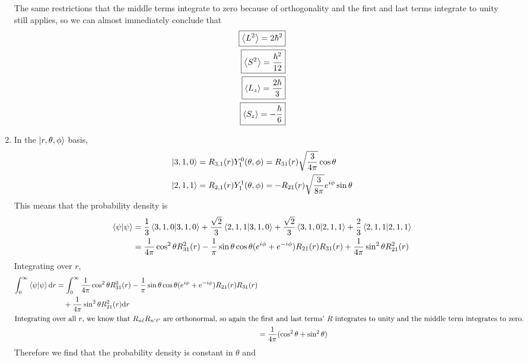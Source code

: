 \begin{enumerate}
		The same restrictions that the middle terms integrate to zero because
		of orthogonality and the first and last terms integrate to unity still
		applies, so we can almost immediately conclude that
		\begin{align}
			\boxed{\expval{L^2} = 2{\hbar}^2} \\
			\boxed{\expval{S^2} = \frac{{\hbar}^2}{12}} \\
			\boxed{\expval{L_z} = \frac{2{\hbar}}{3}} \\
			\boxed{\expval{S_z} = -\frac{{\hbar}}{6}}
		\end{align}
	\item
		In the $\ket{r,\theta ,\phi }$ basis,
		\begin{align*}
			\ket{3,1,0} &= R_{3,1}(r) Y_1^0(\theta ,\phi ) = R_{31}(r)
				\sqrt{\frac{3}{4{\pi}}}\cos \theta  \\
			\ket{2,1,1} &= R_{2,1}(r) Y_1^1(\theta ,\phi ) = -R_{21}(r)
				\sqrt{\frac{3}{8{\pi}}} e^{i\phi } \sin \theta  \\
		\end{align*}
		This means that the probability density is
		\begin{align*}
			\braket{\psi }{\psi } &= \frac 13 \braket{3,1,0}{3,1,0} +
				\frac{\sqrt{2}}{3} \braket{2,1,1}{3,1,0} +
				\frac{\sqrt{2}}{3} \braket{3,1,0}{2,1,1} +
				\frac 23 \braket{2,1,1}{2,1,1} \\
			{} &= \frac{1}{4{\pi}}\cos^2 \theta  R_{31}^2(r) - \frac{1}{{\pi}} \sin \theta  \cos \theta 
				(e^{i\phi } + e^{-i\phi }) R_{21}(r) R_{31}(r) + \frac{1}{4{\pi}}
				\sin^2 \theta  R_{21}^2(r)
		\end{align*}
		Integrating over $r$,
		\begin{align*}
			\begin{split}
				\int_0^\infty  \braket{\psi }{\psi } \dd r &=
					\int_0^\infty  \frac{1}{4{\pi}}\cos^2 \theta  R_{31}^2(r) -
					\frac{1}{{\pi}} \sin \theta \cos \theta  (e^{i\phi } + e^{-i\phi })
					R_{21}(r)R_{31}(r)\\
					&\quad + \frac{1}{4{\pi}} \sin^2 \theta  R_{21}^2(r) \dd r
			\end{split}\\
		\intertext{Integrating over all $r$, we know that $R_{n\ell }R_{n'\ell '}$
		are orthonormal, so again the first and last terms' $R$ integrates to
		unity and the middle term integrates to zero.}
			{} &= \frac{1}{4{\pi}}(\cos^2 \theta  + \sin^2 \theta )
		\end{align*}
		Therefore we find that the probability density is constant in $\theta $ and

\end{enumerate}
